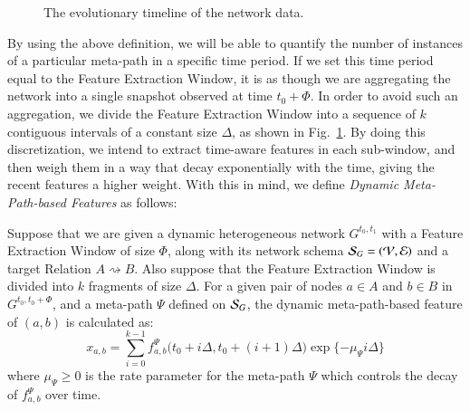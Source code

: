 \begin{figure}
	\begin{chronology}[align=left, startyear=0,stopyear=200, width=\columnwidth, height=1pt, startdate=false, stopdate=false, arrowwidth=4pt, arrowheight=3pt]
		\scriptsize
	\end{chronology}
	\caption{The evolutionary timeline of the network data.}
	\label{fig:timeline}
\end{figure}

By using the above definition, we will be able to quantify the number of instances of a particular meta-path in a specific time period. If we set this time period equal to the Feature Extraction Window, it is as though we are aggregating the network into a single snapshot observed at time $t_0+\Phi$. In order to avoid such an aggregation, we divide the Feature Extraction Window into a sequence of $k$ contiguous intervals of a constant size $\Delta$, as shown in Fig.~\ref{fig:timeline}. By doing this discretization, we intend to extract time-aware features in each sub-window, and then weigh them in a way that decay exponentially with the time, giving the recent features a higher weight. With this in mind, we define \emph{Dynamic Meta-Path-based Features} as follows:

\begin{definition}
Suppose that we are given a dynamic heterogeneous network $G^{t_0,t_1}$ with a Feature Extraction Window of size $\Phi$, along with its network schema $\mathcal{S}_G=(\mathcal{V}, \mathcal{E})$ and a target Relation $A\rightsquigarrow B$. Also suppose that the Feature Extraction Window is divided into $k$ fragments of size $\Delta$. For a given pair of nodes $a\in A$ and $b\in B$ in $G^{t_0,t_0+\Phi}$, and a meta-path $\Psi$ defined on $\mathcal{S}_G$, the dynamic meta-path-based feature of $(a,b)$ is calculated as:
\begin{equation}
x_{a,b}=\sum_{i=0}^{k-1}f_{a,b}^\Psi\Big(t_0+i\Delta, t_0+(i+1)\Delta\Big)\exp\{-\mu_\Psi i\Delta\}
\end{equation}
where $\mu_\Psi\ge0$ is the rate parameter for the meta-path $\Psi$ which controls the decay of $f_{a,b}^\Psi$ over time.
\end{definition}

